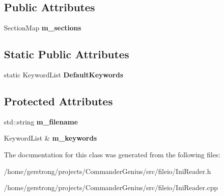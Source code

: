 \subsection*{Public Attributes}
\begin{DoxyCompactItemize}
\item 
\hypertarget{class_ini_reader_a584bac3f1cd98bbe786c746b6624bc18}{
SectionMap {\bfseries m\_\-sections}}
\label{class_ini_reader_a584bac3f1cd98bbe786c746b6624bc18}

\end{DoxyCompactItemize}
\subsection*{Static Public Attributes}
\begin{DoxyCompactItemize}
\item 
\hypertarget{class_ini_reader_a90407192f7ae925b1c36e099352f5142}{
static KeywordList {\bfseries DefaultKeywords}}
\label{class_ini_reader_a90407192f7ae925b1c36e099352f5142}

\end{DoxyCompactItemize}
\subsection*{Protected Attributes}
\begin{DoxyCompactItemize}
\item 
\hypertarget{class_ini_reader_aacee78ea5801e3ec3379bed91a92b07b}{
std::string {\bfseries m\_\-filename}}
\label{class_ini_reader_aacee78ea5801e3ec3379bed91a92b07b}

\item 
\hypertarget{class_ini_reader_ac177c92e1a10681857932d6a0661af1e}{
KeywordList \& {\bfseries m\_\-keywords}}
\label{class_ini_reader_ac177c92e1a10681857932d6a0661af1e}

\end{DoxyCompactItemize}


The documentation for this class was generated from the following files:\begin{DoxyCompactItemize}
\item 
/home/gerstrong/projects/CommanderGenius/src/fileio/IniReader.h\item 
/home/gerstrong/projects/CommanderGenius/src/fileio/IniReader.cpp\end{DoxyCompactItemize}
